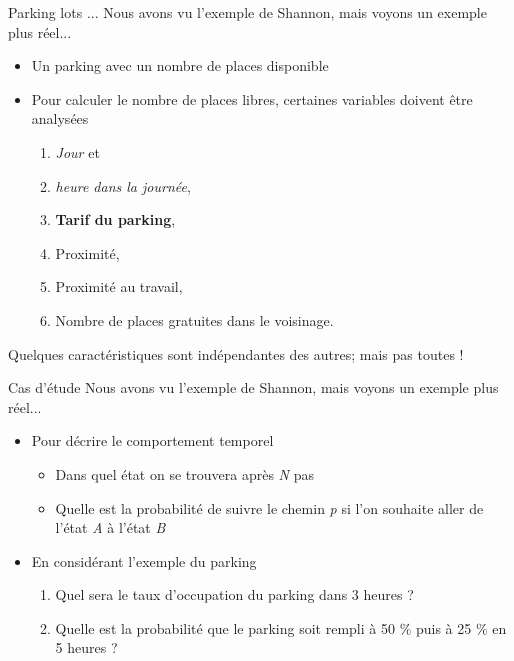 \documentclass[aspectratio=169,xcolor=dvipsnames, t]{beamer}
\begin{document}
\begin{frame}{Parking lots ...}
	Nous avons vu l'exemple de Shannon, mais voyons un exemple plus réel...
	\begin{itemize}
		\item Un parking avec un nombre de places disponible
		\item Pour calculer le nombre de places libres, certaines variables doivent être analysées
		\begin{enumerate}
			\item \textit{Jour} et 
			\item \textit{heure dans la journée},
			\item \textbf{Tarif du parking},
			\item Proximité,
			\item Proximité au travail,
			\item Nombre de places gratuites dans le voisinage.
		\end{enumerate}
	\end{itemize}
	
	Quelques caractéristiques sont indépendantes des autres; mais pas toutes !
	
\end{frame}

\begin{frame}{Cas d'étude}
	Nous avons vu l'exemple de Shannon, mais voyons un exemple plus réel...
	\begin{itemize}
		\item Pour décrire le comportement temporel
		\begin{itemize}
			\item Dans quel état on se trouvera après \textit{N} pas
			\item Quelle est la probabilité de suivre le chemin \textit{p} si l'on souhaite aller de l'état \textit{A} à l'état \textit{B}
		\end{itemize}
		\item En considérant l'exemple du parking
		\begin{enumerate}
			\item Quel sera le taux d'occupation du parking dans 3 heures ?
			\item Quelle est la probabilité que le parking soit rempli à 50 \% puis à 25 \% en 5 heures ?
		\end{enumerate}
	\end{itemize}
	
\end{frame}
\end{document}
